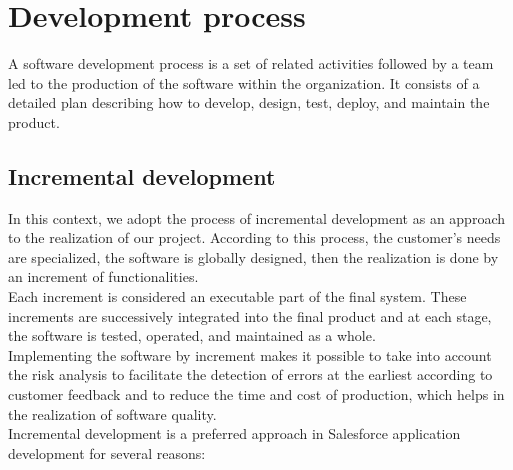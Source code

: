 \section{Development process}
A software development process is a set of related activities
followed by a team led to the production of the software within the organization. It consists of a detailed plan describing how to develop, design,
test, deploy, and maintain the product. \cite{4}
\subsection{Incremental development}

In this context, we adopt the process of incremental development as an approach to the realization of our project. According to this process, the customer's needs are specialized, the software is globally designed,
then the realization is done by an increment of functionalities. \\
Each increment
is considered an executable part of the final system. These increments
are successively integrated into the final product and at each stage, the software is
tested, operated, and maintained as a whole. \\
Implementing the software by
increment makes it possible to take into account the risk analysis to facilitate
the detection of errors at the earliest according to customer feedback and to reduce
the time and cost of production, which helps in the realization of software
quality.\\
Incremental development is a preferred approach in Salesforce application development for several reasons:
